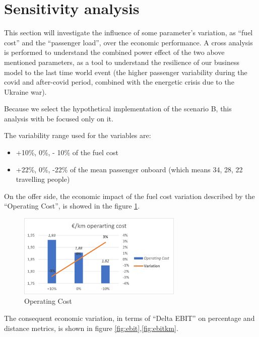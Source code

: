 \section{Sensitivity analysis}
This section will investigate the influence of some parameter’s variation, as “fuel cost” and the “passenger load”, over the economic performance. A cross analysis is performed to understand the combined power effect of the two above mentioned parameters, as a tool to understand the resilience of our business model to the last time world event (the higher passenger variability during the covid and after-covid period, combined with the energetic crisis due to the Ukraine war).

Because we select the hypothetical implementation of the scenario B, this analysis with be focused only on it.

The variability range used for the variables are:
\begin{itemize}
    \item +10\%, 0\%, - 10\% of the fuel cost
    \item +22\%, 0\%, -22\% of the mean passenger onboard (which means 34, 28, 22 travelling people)
\end{itemize}

On the offer side, the economic impact of the fuel cost variation described by the “Operating Cost”, is showed in the figure \ref{fig:opercost}.

\begin{figure}[h]
    \centering
    \includegraphics[width=0.7\textwidth]{Images/financial/operating_cost.png}
    \caption{Operating Cost}
    \label{fig:opercost}
\end{figure}

The consequent economic variation, in terms of “Delta EBIT” on percentage and distance metrics, is shown in figure \ref{fig:ebit},\ref{fig:ebitkm}.

